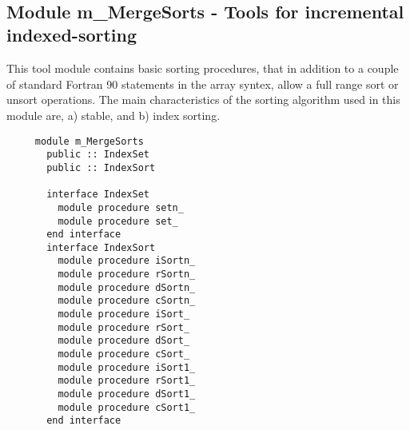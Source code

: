 
 
 
\mbox{}\hrulefill\ 
 

  \subsection{Module m\_MergeSorts - Tools for incremental indexed-sorting }

     This tool module contains basic sorting procedures, that in
     addition to a couple of standard Fortran 90 statements in the
     array syntex, allow a full range sort or unsort operations.
     The main characteristics of the sorting algorithm used in this
     module are, a) stable, and b) index sorting.
  
\begin{verbatim} 
     module m_MergeSorts
       public :: IndexSet
       public :: IndexSort
 
       interface IndexSet
         module procedure setn_
         module procedure set_
       end interface
       interface IndexSort
         module procedure iSortn_
         module procedure rSortn_
         module procedure dSortn_
         module procedure cSortn_
         module procedure iSort_
         module procedure rSort_
         module procedure dSort_
         module procedure cSort_
         module procedure iSort1_
         module procedure rSort1_
         module procedure dSort1_
         module procedure cSort1_
       end interface
\end{verbatim}
 
 
